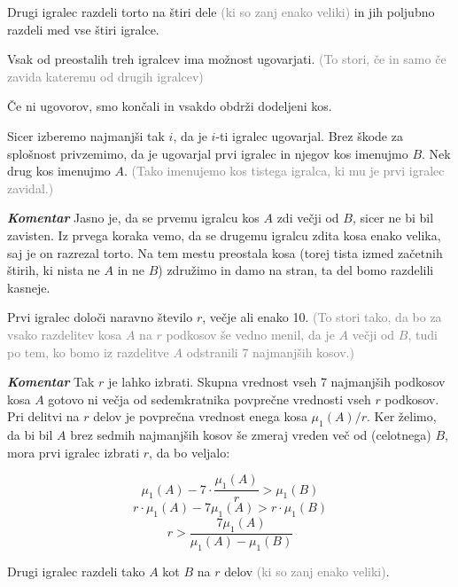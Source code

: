 \documentclass[a4paper,12pt]{article}
\begin{document}
\begin{protokol}

\item Drugi igralec razdeli torto na štiri dele \textcolor{gray}{(ki so zanj enako veliki)} in jih poljubno razdeli med vse štiri igralce.

\item Vsak od preostalih treh igralcev ima možnost ugovarjati. \textcolor{gray}{(To stori, če in samo če zavida kateremu od drugih igralcev)}

\item Če ni ugovorov, smo končali in vsakdo obdrži dodeljeni kos.

\item Sicer izberemo najmanjši tak $i$, da je $i$-ti igralec ugovarjal. Brez škode za splošnost privzemimo, da je ugovarjal prvi igralec in njegov kos imenujmo $B$. Nek drug kos imenujmo $A$. \textcolor{gray}{(Tako imenujemo kos tistega igralca, ki mu je prvi igralec zavidal.)}

\item [\textbf{\em Komentar}] Jasno je, da se prvemu igralcu kos $A$ zdi večji od $B$, sicer ne bi bil zavisten. Iz prvega koraka vemo, da se drugemu igralcu zdita kosa enako velika, saj je on razrezal torto. Na tem mestu preostala kosa (torej tista izmed začetnih štirih, ki nista ne $A$ in ne $B$) združimo in damo na stran, ta del bomo razdelili kasneje.

\item Prvi igralec določi naravno število $r$, večje ali enako 10. \textcolor{gray}{(To stori tako, da bo za vsako razdelitev kosa $A$ na $r$ podkosov še vedno menil, da je $A$ večji od $B$, tudi po tem, ko bomo iz razdelitve $A$ odstranili 7 najmanjših kosov.)} %

\item [\textbf{\em Komentar}] Tak $r$ je lahko izbrati. Skupna vrednost vseh 7 najmanjših podkosov kosa $A$ gotovo ni večja od sedemkratnika povprečne vrednosti vseh $r$ podkosov. Pri delitvi na $r$ delov je povprečna vrednost enega kosa $\mu_1(A)/r$. Ker želimo, da bi bil $A$ brez sedmih najmanjših kosov še zmeraj vreden več od (celotnega) $B$, mora prvi igralec izbrati $r$, da bo veljalo:

$$ \mu_1(A) - 7 \cdot \frac{\mu_1(A)}{r} > \mu_1(B) $$
$$r \cdot \mu_1(A) - 7 \mu_1(A) > r \cdot \mu_1(B) $$
$$r > \frac{7 \mu_1(A)}{\mu_1(A) - \mu_1(B)} $$

\item Drugi igralec razdeli tako $A$ kot $B$ na $r$ delov \textcolor{gray}{(ki so zanj enako veliki)}.


\end{protokol}
\end{document}
